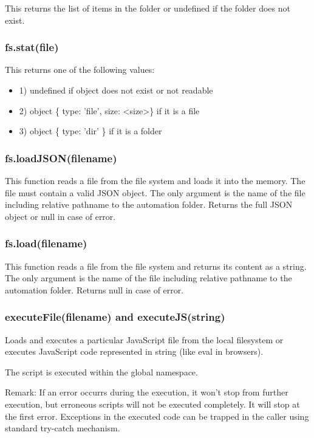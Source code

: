 This returns the list of items in the folder or undefined if the folder does not exist.


\subsubsection{fs.stat(file)}

This returns one of the following values:

\begin{itemize}
\item 1) undefined if object does not exist or not readable
\item 2) object \{ type: 'file', size: \textless{}size\textgreater{}\} if it is a file
\item 3) object \{ type: 'dir' \} if it is a folder
\end{itemize} 


\subsubsection{fs.loadJSON(filename)}

This function reads a file from the file system and loads it into the memory. The file 
must contain a valid JSON object. The only argument is the name of the file including 
relative pathname to the automation folder. Returns the full JSON object or null in case of error.

\subsubsection{fs.load(filename)}

This function reads a file from the file system and returns its content as a string. The 
only argument is the name of the file including relative pathname to the automation folder.
Returns null in case of error.

\subsubsection{executeFile(filename) and executeJS(string)}

Loads and executes a particular JavaScript file from the local filesystem or executes 
JavaScript code represented in string (like eval in browsers).

The script is executed within the global namespace.

Remark: If an error occurrs during the execution, it won't stop from further execution, 
but erroneous scripts will not be executed completely. It will stop at the first error.
Exceptions in the executed code can be trapped in the caller using standard try-catch mechanism.

